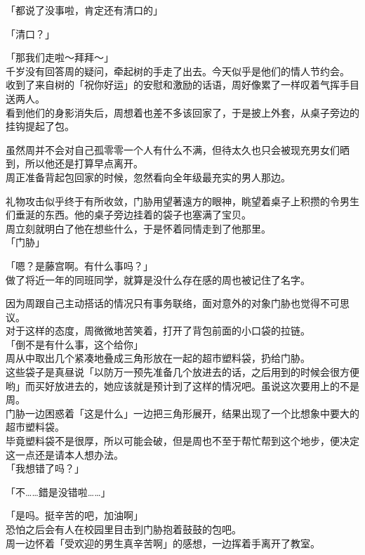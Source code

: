 「都说了没事啦，肯定还有清口的」

「清口？」

「那我们走啦～拜拜～」\\

千岁没有回答周的疑问，牵起树的手走了出去。今天似乎是他们的情人节约会。\\

收到了来自树的「祝你好运」的安慰和激励的话语，周好像累了一样叹着气挥手目送两人。\\

看到他们的身影消失后，周想着也差不多该回家了，于是披上外套，从桌子旁边的挂钩提起了包。

虽然周并不会对自己孤零零一个人有什么不满，但待太久也只会被现充男女们晒到，所以他还是打算早点离开。\\

周正准备背起包回家的时候，忽然看向全年级最充实的男人那边。

礼物攻击似乎终于有所收敛，门胁用望著遠方的眼神，眺望着桌子上积攒的令男生们垂涎的东西。他的桌子旁边挂着的袋子也塞满了宝贝。\\

周立刻就明白了他在想些什么，于是怀着同情走到了他那里。\\

「门胁」

「嗯？是藤宫啊。有什么事吗？」\\

做了将近一年的同班同学，就算是没什么存在感的周也被记住了名字。

因为周跟自己主动搭话的情况只有事务联络，面对意外的对象门胁也觉得不可思议。\\

对于这样的态度，周微微地苦笑着，打开了背包前面的小口袋的拉链。\\

「倒不是有什么事，这个给你」\\

周从中取出几个紧凑地叠成三角形放在一起的超市塑料袋，扔给门胁。\\

这些袋子是真昼说「以防万一预先准备几个放进去的话，之后用到的时候会很方便哟」而买好放进去的，她应该就是预计到了这样的情况吧。虽说这次要用上的不是周。\\

门胁一边困惑着「这是什么」一边把三角形展开，结果出现了一个比想象中要大的超市塑料袋。\\

毕竟塑料袋不是很厚，所以可能会破，但是周也不至于帮忙帮到这个地步，便决定这一点还是请本人想办法。\\

「我想错了吗？」

「不……錯是没错啦……」

「是吗。挺辛苦的吧，加油啊」\\

恐怕之后会有人在校园里目击到门胁抱着鼓鼓的包吧。\\

周一边怀着「受欢迎的男生真辛苦啊」的感想，一边挥着手离开了教室。

